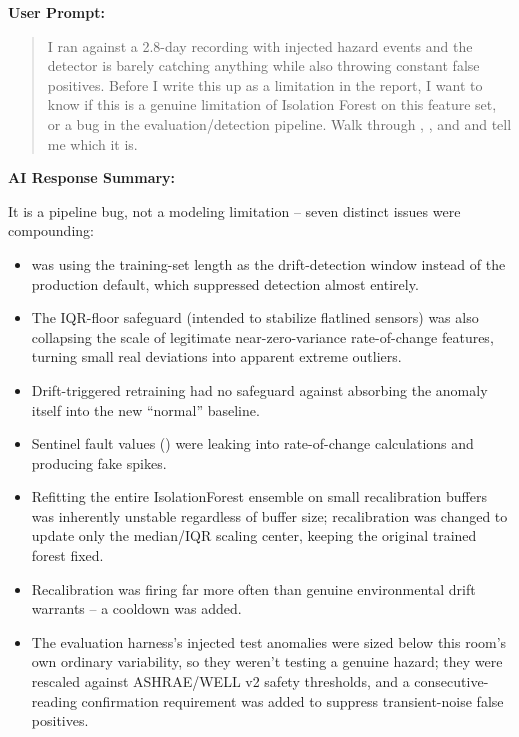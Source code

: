 \documentclass[conference]{IEEEtran}
\begin{document}
\par\vspace{4pt}\par\vspace{2pt}

\noindent\textbf{User Prompt:}\par

\begin{quote}
I ran \texttt{} against a 2.8-day recording with injected hazard events and the detector is barely catching anything while also throwing constant false positives. Before I write this up as a limitation in the report, I want to know if this is a genuine limitation of Isolation Forest on this feature set, or a bug in the evaluation/detection pipeline. Walk through \texttt{}, \texttt{}, and \texttt{} and tell me which it is.
\end{quote}

\noindent\textbf{AI Response Summary:}\par

It is a pipeline bug, not a modeling limitation -- seven distinct issues were compounding:

\begin{itemize}
\setlength{\itemsep}{2pt}
\item \texttt{} was using the training-set length as the drift-detection window instead of the production default, which suppressed detection almost entirely.
\item The IQR-floor safeguard (intended to stabilize flatlined sensors) was also collapsing the scale of legitimate near-zero-variance rate-of-change features, turning small real deviations into apparent extreme outliers.
\item Drift-triggered retraining had no safeguard against absorbing the anomaly itself into the new ``normal'' baseline.
\item Sentinel fault values (\texttt{}) were leaking into rate-of-change calculations and producing fake spikes.
\item Refitting the entire IsolationForest ensemble on small recalibration buffers was inherently unstable regardless of buffer size; recalibration was changed to update only the median/IQR scaling center, keeping the original trained forest fixed.
\item Recalibration was firing far more often than genuine environmental drift warrants -- a cooldown was added.
\item The evaluation harness's injected test anomalies were sized below this room's own ordinary variability, so they weren't testing a genuine hazard; they were rescaled against ASHRAE/WELL v2 safety thresholds, and a consecutive-reading confirmation requirement was added to suppress transient-noise false positives.
\end{itemize}
\end{document}
